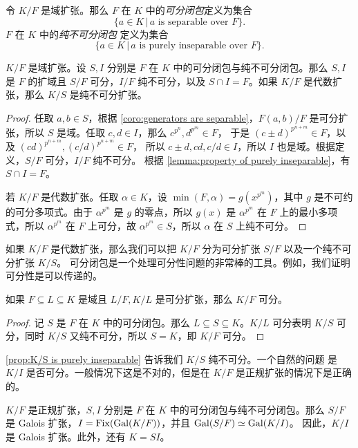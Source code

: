 \begin{definition}
  令 $K/F$ 是域扩张。那么 $F$ 在 $K$ 中的\emph{可分闭包}定义为集合
  \[ 
    \{a\in K\,|\, \text{$a$ is separable over $F$}\}.
  \]$F$ 在 $K$ 中的\emph{纯不可分闭包}
  定义为集合 
  \[
    \{a\in K\,|\, \text{$a$ is purely inseparable over $F$}\}.
  \]
\end{definition}

\begin{proposition}\label{prop:K/S is purely inseparable}
  $K/F$ 是域扩张。设 $S,I$ 分别是 $F$ 在 $K$ 中的可分闭包与纯不可分闭包。那么 $S,I$
  是 $F$ 的扩域且 $S/F$ 可分，$I/F$ 纯不可分，以及 $S\cap I=F$。如果 $K/F$
  是代数扩张，那么 $K/S$ 是纯不可分扩张。
\end{proposition}
\begin{proof}
  任取 $a,b\in S$，根据 \autoref{coro:generators are separable}，$F(a,b)/F$
  是可分扩张，所以 $S$ 是域。任取 $c,d\in I$，那么 $c^{p^n},d^{p^m}\in F$，
  于是 $(c\pm d)^{p^{n+m}}\in F$，以及 $(cd)^{p^{n+m}},(c/d)^{p^{n+m}}\in F$，
  所以 $c\pm d,cd,c/d\in I$，所以 $I$ 也是域。根据定义，$S/F$ 可分，$I/F$ 纯不可分。
  根据 \autoref{lemma:property of purely inseparable}，有 $S\cap I=F$。

  若 $K/F$ 是代数扩张。任取 $\alpha\in K$，设 $\min(F,\alpha)=g(x^{p^m})$，其中 $g$
  是不可约的可分多项式。由于 $\alpha^{p^m}$ 是 $g$ 的零点，所以 $g(x)$ 
  是 $\alpha^{p^m}$ 在 $F$ 上的最小多项式，所以 $\alpha^{p^m}$ 在 $F$ 上可分，故
  $\alpha^{p^m}\in S$，所以 $\alpha$ 在 $S$ 上纯不可分。 
\end{proof}

如果 $K/F$ 是代数扩张，那么我们可以把 $K/F$ 分为可分扩张 $S/F$ 以及一个纯不可分扩张 $K/S$。
可分闭包是一个处理可分性问题的非常棒的工具。例如，我们证明可分性是可以传递的。

\begin{proposition}
  如果 $F\subseteq L\subseteq K$ 是域且 $L/F,K/L$ 是可分扩张，那么 $K/F$ 可分。
\end{proposition}
\begin{proof}
  记 $S$ 是 $F$ 在 $K$ 中的可分闭包。那么 $L\subseteq S\subseteq K$。$K/L$
  可分表明 $K/S$ 可分，同时 $K/S$ 又纯不可分，所以 $S=K$，即 $K/F$ 可分。
\end{proof}

\autoref{prop:K/S is purely inseparable} 告诉我们 $K/S$ 纯不可分。一个自然的问题
是 $K/I$ 是否可分。一般情况下这是不对的，但是在 $K/F$ 是正规扩张的情况下是正确的。

\begin{theorem}\label{thm:Gal(K/I)}
  $K/F$ 是正规扩张，$S,I$ 分别是 $F$ 在 $K$ 中的可分闭包与纯不可分闭包。那么 $S/F$
  是 Galois 扩张，$I=\operatorname{Fix}(\operatorname{Gal}(K/F))$，并且 $\operatorname{Gal}(S/F)\simeq \operatorname{Gal}(K/I)$。
  因此，$K/I$ 是 Galois 扩张。此外，还有 $K=SI$。
\end{theorem}

